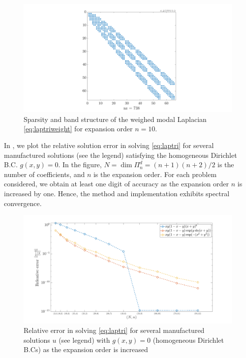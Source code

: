 \begin{figure}[H]
	\centering
	\includegraphics[width=0.7\linewidth]{./figures/lap_tri_weighted_mat}
	\caption{Sparsity and band structure of the weighed modal Laplacian \eqref{eq:laptriweight} for expansion order $n=10$.}\label{fig:laptrimat1}
\end{figure}
In , we plot the relative solution error in solving \eqref{eq:laptri} for several manufactured solutions (see the legend) satisfying the homogeneous Dirichlet B.C. $g(x,y)=0$. In the figure, $N = \dim\Pi_{n}^d = (n+1)(n+2)/2$ is the number of coefficients, and $n$ is the expansion order. For each problem considered, we obtain at least one digit of accuracy as the expansion order $n$ is increased by one. Hence, the method and implementation exhibits spectral convergence.
\begin{figure}[H]
	\centering
	\includegraphics[width=0.9\linewidth]{./figures/errs_lap_weight}
	\caption{Relative error in solving \eqref{eq:laptri} for several manufactured solutions $u$ (see legend) with $g(x,y) = 0$ (homogeneous Dirichlet B.Cs) as the expansion order is increased}\label{fig:errslapweight}
\end{figure}

\newpage
{}

